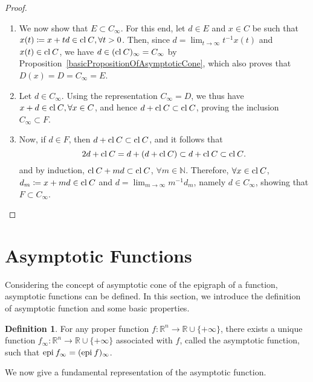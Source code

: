 \documentclass[a4paper,11pt, oneside]{book}
\theoremstyle{definition}
\newtheorem{dfn}[thm]{Definition}
\newcommand{\NaturalNumberSet}{\mathbb{N}}
\newcommand{\RealNumberSet}{\mathbb{R}}
\newcommand{\NDemenstionalRealEuclideanSpace}{\mathbb{R}^n}
\newcommand{\Closure}[1]{\text{\rm cl\:${#1}$}} %
\newcommand{\Epigraph}[1]{\text{\rm epi\:${#1}$}} %
\newcommand{\ExtendedRealValuedFunction}[2]{{#1}: {#2} \to \RealNumberSet \cup \{+\infty\}}
\begin{document}
\begin{proof}
\begin{enumerate}[label=\roman*,align=CenterWithParen]
    \item We now show that $E \subset C_{\infty}$. For this end, let $d \in E$ and $x \in C$ be such that $x(t) \coloneqq x + td \in \Closure{C}, \forall t>0$. Then, since $d = \lim_{t \to \infty} t^{-1}x(t)$ and $x(t) \in \Closure{C}$, we have $d \in (\Closure{C})_{\infty} = C_{\infty}$ by Proposition~\ref{basicPropositionOfAsymptoticCone}, which also proves that $D(x) = D = C_{\infty} = E$.
    \item Let $d \in C_{\infty}$. Using the representation $C_{\infty} = D$, we thus have $x+d \in \Closure{C}, \forall x \in C$, and hence $d + \Closure{C} \subset \Closure{C}$, proving the inclusion $C_{\infty} \subset F$.
    \item Now, if $d \in F$, then $d + \Closure{C} \subset \Closure{C}$, and it follows that
    \begin{equation}
      2d + \Closure{C} = d + (d + \Closure{C}) \subset d + \Closure{C} \subset \Closure{C}. \notag
    \end{equation}
    and by induction, $\Closure{C} + md \subset \Closure{C}$, $\forall m\in \NaturalNumberSet$. Therefore, $\forall x \in \Closure{C}$, $d_m \coloneqq x+md \in \Closure{C}$ and $d = \lim_{m \to \infty} m^{-1}d_m$, namely $d \in C_{\infty}$, showing that $F \subset C_{\infty}$.
  \end{enumerate}
\end{proof}

\section{Asymptotic Functions}

Considering the concept of asymptotic cone of the epigraph of a function, asymptotic functions can be defined. In this section, we introduce the definition of asymptotic function and some basic properties.

\begin{dfn}
  For any proper function $\ExtendedRealValuedFunction{f}{\NDemenstionalRealEuclideanSpace}$, there exists a unique function $\ExtendedRealValuedFunction{f_{\infty}}{\NDemenstionalRealEuclideanSpace}$ associated with $f$, called the asymptotic function, such that $\Epigraph{f_\infty} = (\Epigraph{f})_{\infty}$.
\end{dfn}

We now give a fundamental representation of the asymptotic function.
\end{document}
